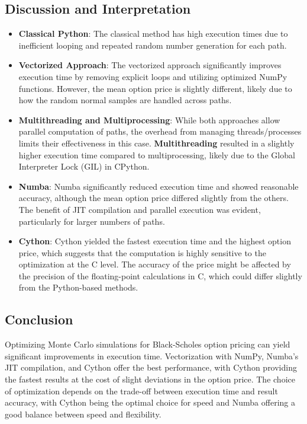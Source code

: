 \documentclass[12pt,a4paper]{report}
\begin{document}
\subsection{Discussion and Interpretation}

\begin{itemize}
    \item \textbf{Classical Python}: The classical method has high execution times due to inefficient looping and repeated random number generation for each path.
    \item \textbf{Vectorized Approach}: The vectorized approach significantly improves execution time by removing explicit loops and utilizing optimized NumPy functions. However, the mean option price is slightly different, likely due to how the random normal samples are handled across paths.
    \item \textbf{Multithreading and Multiprocessing}: While both approaches allow parallel computation of paths, the overhead from managing threads/processes limits their effectiveness in this case. \textbf{Multithreading} resulted in a slightly higher execution time compared to multiprocessing, likely due to the Global Interpreter Lock (GIL) in CPython.
    \item \textbf{Numba}: Numba significantly reduced execution time and showed reasonable accuracy, although the mean option price differed slightly from the others. The benefit of JIT compilation and parallel execution was evident, particularly for larger numbers of paths.
    \item \textbf{Cython}: Cython yielded the fastest execution time and the highest option price, which suggests that the computation is highly sensitive to the optimization at the C level. The accuracy of the price might be affected by the precision of the floating-point calculations in C, which could differ slightly from the Python-based methods.
\end{itemize}

\subsection{Conclusion}

Optimizing Monte Carlo simulations for Black-Scholes option pricing can yield significant improvements in execution time. Vectorization with NumPy, Numba's JIT compilation, and Cython offer the best performance, with Cython providing the fastest results at the cost of slight deviations in the option price. The choice of optimization depends on the trade-off between execution time and result accuracy, with Cython being the optimal choice for speed and Numba offering a good balance between speed and flexibility.
\end{document}
